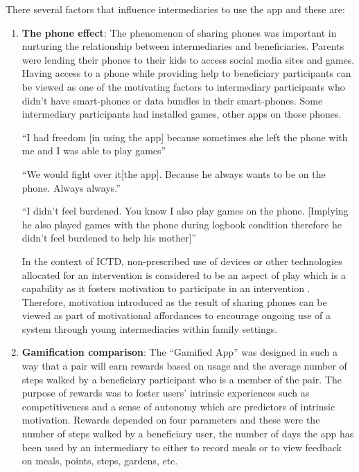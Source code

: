 There several factors that influence intermediaries to use the app and these are:
\begin{enumerate}

\item{\textbf{The phone effect}}: The phenomenon of sharing phones was important in nurturing the relationship between intermediaries and beneficiaries. Parents were lending their phones to their kids to access social media sites and games. Having access to a phone while providing help to beneficiary participants can be viewed as one of the motivating factors to intermediary participants who didn't have smart-phones or data bundles in their smart-phones. Some intermediary participants had installed games, other apps on those phones.

 {``I had freedom [in using the app] because sometimes she left the phone with me and I was able to play games''}

 {``We would fight over it[the app]. Because he always wants to be on the phone. Always always.''}

 {``I didn't feel burdened. You know I also play games on the phone. [Implying he also played games with the phone during logbook condition therefore he didn't feel burdened to help his mother]''}

In the context of ICTD, non-prescribed use of devices or other technologies allocated for an intervention is considered to be an aspect of play which is a capability as it fosters motivation to participate in an intervention \citep{ferrplay2015}. Therefore, motivation introduced as the result of sharing phones can be viewed as part of motivational affordances to encourage ongoing use of a system through young intermediaries within family settings.

\item{\textbf{Gamification comparison}}: The ``Gamified App'' was designed in such a way that a pair will earn rewards based on usage and the average number of steps walked by a beneficiary participant who is a member of the pair. The purpose of rewards was to foster users' intrinsic experiences such as competitiveness and a sense of autonomy which are predictors of intrinsic motivation. Rewards depended on four parameters and these were the number of steps walked by a beneficiary user, the number of days the app has been used by an intermediary to either to record meals or to view feedback on meals, points, steps, gardens, etc. 


\end{enumerate}
